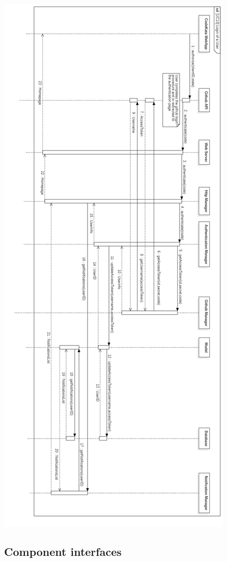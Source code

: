 \documentclass{article}
\begin{document}
\newpage
\begin{center}
    \includegraphics[angle=-90,width=0.5\linewidth]{uc13.jpg}
  \label{fig:uc13}
\end{center}

\newpage
\subsection{Component interfaces}
\label{ssc:ci}
\end{document}
